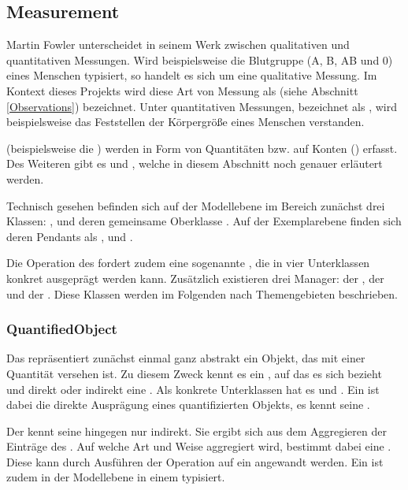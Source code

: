 \subsection{Measurement}
Martin Fowler unterscheidet in seinem Werk  zwischen qualitativen und quantitativen
Messungen. Wird beispielsweise die Blutgruppe (A, B, AB und 0) eines Menschen typisiert, so handelt es sich um
eine qualitative Messung. Im Kontext dieses Projekts wird diese Art von Messung als  (siehe Abschnitt
\ref{Observations}) bezeichnet. Unter quantitativen Messungen, bezeichnet als , wird
beispielsweise das Feststellen der Körpergröße eines Menschen verstanden.

 (beispielsweise die ) werden in Form von Quantitäten bzw.
 auf Konten () erfasst. Des Weiteren gibt es  und
, welche in diesem Abschnitt noch genauer erläutert werden.

Technisch gesehen befinden sich auf der Modellebene im Bereich  zunächst drei Klassen:
,  und deren gemeinsame Oberklasse . Auf der
Exemplarebene finden sich deren Pendants als ,  und .

Die Operation  des  fordert zudem eine sogenannte ,
die in vier Unterklassen konkret ausgeprägt werden kann.
Zusätzlich existieren drei Manager: der , der  und der
. Diese Klassen werden im Folgenden nach Themengebieten beschrieben.


\subsubsection{QuantifiedObject}\label{Measurement:QuantifiedObject}
Das  repräsentiert zunächst einmal ganz abstrakt ein Objekt, das mit einer Quantität versehen
ist. Zu diesem Zweck kennt es ein , auf das es sich bezieht und direkt oder indirekt eine .
Als konkrete Unterklassen hat es  und . Ein  ist dabei die
direkte Ausprägung eines quantifizierten Objekts, es kennt seine . 

Der  kennt seine  hingegen nur indirekt. Sie ergibt sich aus dem Aggregieren der Einträge
 des . Auf welche Art und Weise aggregiert wird, bestimmt dabei eine
. Diese kann durch Ausführen der Operation  auf ein 
angewandt werden. Ein  ist zudem in der Modellebene in einem  typisiert.


